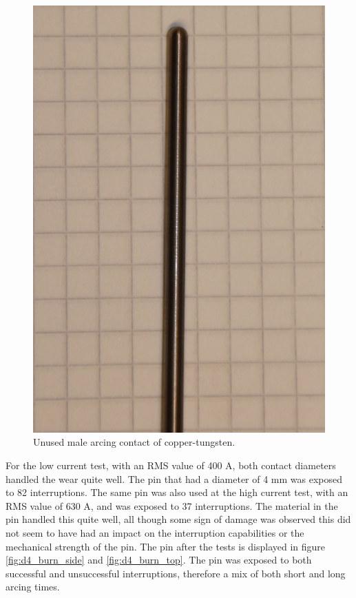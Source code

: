 \documentclass[10pt,a4paper,twoside]{article}
\begin{document}
\begin{figure}[H]
\centering
\includegraphics[scale=0.3]{Bilder/Discussion/d3_unused.png}
\caption{Unused male arcing contact of copper-tungsten.} \label{fig:unused_d3}
\end{figure}

For the low current test, with an RMS value of 400 A, both contact diameters handled the wear quite well. The pin that had a diameter of 4 mm was exposed to 82 interruptions. The same pin was also used at the high current test, with an RMS value of 630 A, and was exposed to 37 interruptions. The material in the pin handled this quite well, all though some sign of damage was observed this did not seem to have had an impact on the interruption capabilities or the mechanical strength of the pin. The pin after the tests is displayed in figure \ref{fig:d4_burn_side} and \ref{fig:d4_burn_top}. The pin was exposed to both successful and unsuccessful interruptions, therefore a mix of both short and long arcing times.
\end{document}
